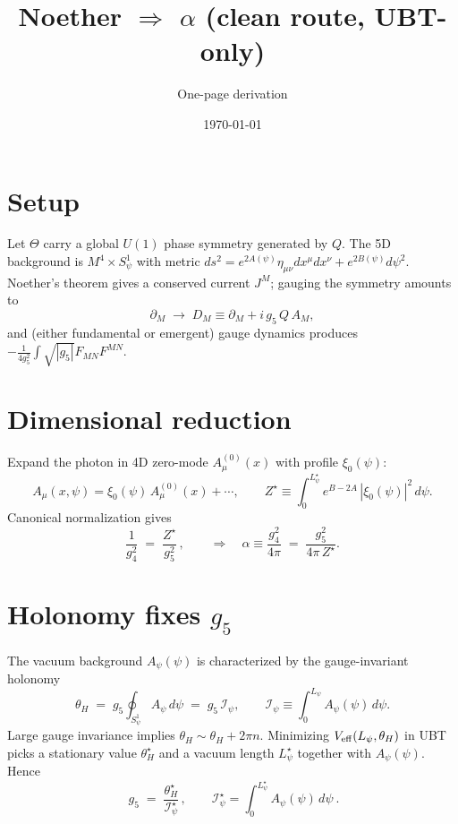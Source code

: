 \documentclass[11pt]{article}
\title{Noether $\Rightarrow$ $\alpha$ (clean route, UBT-only)}
\author{One-page derivation}
\date{\today}
\begin{document}
\maketitle
\vspace{-1.2em}

\section*{Setup}
Let $\Theta$ carry a global $U(1)$ phase symmetry generated by $Q$. The 5D background is
$M^4\times S^1_\psi$ with metric $ds^2=e^{2A(\psi)}\eta_{\mu\nu}dx^\mu dx^\nu + e^{2B(\psi)}d\psi^2$.
Noether's theorem gives a conserved current $J^M$; gauging the symmetry amounts to
\begin{equation}
\partial_M \;\to\; D_M \equiv \partial_M + i\,g_5\,Q\,A_M,
\end{equation}
and (either fundamental or emergent) gauge dynamics produces $-\frac{1}{4g_5^2}\!\int\!\sqrt{|g_5|}F_{MN}F^{MN}$.

\section*{Dimensional reduction}
Expand the photon in 4D zero-mode $A_\mu^{(0)}(x)$ with profile $\xi_0(\psi)$:
\begin{equation}
A_\mu(x,\psi) = \xi_0(\psi)\,A_\mu^{(0)}(x) + \cdots,\qquad
Z^\star \equiv \int_0^{L_\psi^\star}\! e^{B-2A}\,|\xi_0(\psi)|^2\,d\psi.
\end{equation}
Canonical normalization gives
\begin{equation}
\frac{1}{g_4^2} \;=\; \frac{Z^\star}{g_5^2}\,,
\qquad
\Rightarrow\quad
\alpha \equiv \frac{g_4^2}{4\pi} \;=\; \frac{g_5^2}{4\pi\,Z^\star}.
\end{equation}

\section*{Holonomy fixes $g_5$}
The vacuum background $A_\psi(\psi)$ is characterized by the gauge-invariant holonomy
\begin{equation}
\theta_H \;=\; g_5\oint_{S^1_\psi} A_\psi\,d\psi \;=\; g_5\,\mathcal I_\psi,\qquad
\mathcal I_\psi \equiv \int_0^{L_\psi} A_\psi(\psi)\,d\psi.
\end{equation}
Large gauge invariance implies $\theta_H\sim\theta_H+2\pi n$. Minimizing $V_{\rm eff}(L_\psi,\theta_H)$ in UBT picks a stationary value $\theta_H^\star$ and a vacuum length $L_\psi^\star$ together with $A_\psi(\psi)$. Hence
\begin{equation}
\boxed{~ g_5 \;=\; \frac{\theta_H^\star}{\mathcal I_\psi^\star}\,,\qquad \mathcal I_\psi^\star=\int_0^{L_\psi^\star}\!A_\psi(\psi)\,d\psi ~.}
\end{equation}
\end{document}
